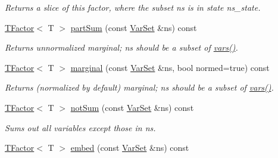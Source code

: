 \begin{CompactItemize}
\begin{CompactList}\small\item\em Returns a slice of this factor, where the subset ns is in state ns\_\-state. \item\end{CompactList}\item 
\hypertarget{classdai_1_1TFactor_f90e2a8a5ef94809ae8905e19fc523e4}{
\hyperlink{classdai_1_1TFactor}{TFactor}$<$ T $>$ \hyperlink{classdai_1_1TFactor_f90e2a8a5ef94809ae8905e19fc523e4}{partSum} (const \hyperlink{classdai_1_1VarSet}{VarSet} \&ns) const }
\label{classdai_1_1TFactor_f90e2a8a5ef94809ae8905e19fc523e4}

\begin{CompactList}\small\item\em Returns unnormalized marginal; ns should be a subset of \hyperlink{classdai_1_1TFactor_54c575d53b8c8a6a03c26c8cdc600ce4}{vars()}. \item\end{CompactList}\item 
\hypertarget{classdai_1_1TFactor_692df5b8aed5f6faeb60e076624d5854}{
\hyperlink{classdai_1_1TFactor}{TFactor}$<$ T $>$ \hyperlink{classdai_1_1TFactor_692df5b8aed5f6faeb60e076624d5854}{marginal} (const \hyperlink{classdai_1_1VarSet}{VarSet} \&ns, bool normed=true) const }
\label{classdai_1_1TFactor_692df5b8aed5f6faeb60e076624d5854}

\begin{CompactList}\small\item\em Returns (normalized by default) marginal; ns should be a subset of \hyperlink{classdai_1_1TFactor_54c575d53b8c8a6a03c26c8cdc600ce4}{vars()}. \item\end{CompactList}\item 
\hypertarget{classdai_1_1TFactor_fd92183f10a4214341ce771b02f8744d}{
\hyperlink{classdai_1_1TFactor}{TFactor}$<$ T $>$ \hyperlink{classdai_1_1TFactor_fd92183f10a4214341ce771b02f8744d}{notSum} (const \hyperlink{classdai_1_1VarSet}{VarSet} \&ns) const }
\label{classdai_1_1TFactor_fd92183f10a4214341ce771b02f8744d}

\begin{CompactList}\small\item\em Sums out all variables except those in ns. \item\end{CompactList}\item 
\hypertarget{classdai_1_1TFactor_81c344b9e204bb57aaca92c281aa7dd3}{
\hyperlink{classdai_1_1TFactor}{TFactor}$<$ T $>$ \hyperlink{classdai_1_1TFactor_81c344b9e204bb57aaca92c281aa7dd3}{embed} (const \hyperlink{classdai_1_1VarSet}{VarSet} \&ns) const }
\label{classdai_1_1TFactor_81c344b9e204bb57aaca92c281aa7dd3}


\end{CompactItemize}
